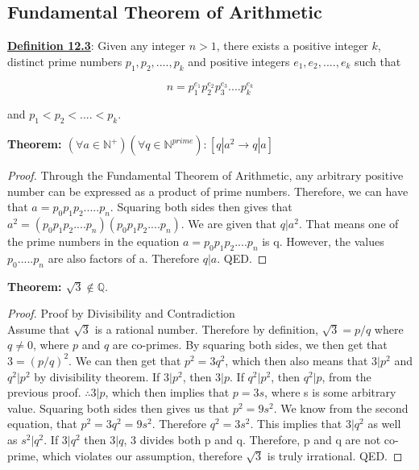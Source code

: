 \subsection{Fundamental Theorem of Arithmetic}
\textbf{\underline{Definition 12.3}}: Given any integer $n>1$, there exists a positive integer $k$, distinct prime numbers $p_1, p_2, ...., p_k$ and positive integers $e_1, e_2, ...., e_k$ such that

\begin{displaymath}
n=p_1^{e_1}p_2^{e_2}p_3^{e_3}....p_k^{e_k}
\end{displaymath}

and $p_1 < p_2 < .... < p_k$.

\begin{example}
    \textbf{Theorem: $(\forall a \in \mathbb{N}^+)(\forall q \in \mathbb{N}^{prime}) : [q|a^2 \rightarrow q|a]$}
\end{example}

\begin{proof}
    Through the Fundamental Theorem of Arithmetic, any arbitrary positive number can be expressed as a product of prime numbers. Therefore, we can have that $a=p_0p_1p_2.....p_n$. Squaring both sides then gives that $a^2=(p_0p_1p_2....p_n)(p_0p_1p_2....p_n)$. We are given that $q|a^2$. That means one of the prime numbers in the equation $a=p_0p_1p_2....p_n$ is q. However, the values $p_0.....p_n$ are also factors of a. Therefore $q|a$. QED.
\end{proof}

\begin{example}
    \textbf{Theorem: $\sqrt{3} \notin \mathbb{Q}$}.
\end{example}

\begin{proof}
    Proof by Divisibility and Contradiction\\
    Assume that $\sqrt{3}$ is a rational number. Therefore by definition, $\sqrt{3}=p/q$ where $q \neq 0$, where $p$ and $q$ are co-primes. By squaring both sides, we then get that $3=(p/q)^2$. We can then get that $p^2=3q^2$, which then also means that $3|p^2$ and $q^2|p^2$ by divisibility theorem. If $3|p^2$, then $3|p$. If $q^2|p^2$, then $q^2|p$, from the previous proof. $\therefore 3|p$, which then implies that $p=3s$, where s is some arbitrary value. Squaring both sides then gives us that $p^2=9s^2$. We know from the second equation, that $p^2=3q^2=9s^2$. Therefore $q^2=3s^2$. This implies that $3|q^2$ as well as $s^2|q^2$. If $3|q^2$ then $3|q$, 3 divides both p and q. Therefore, p and q are not co-prime, which violates our assumption, therefore $\sqrt{3}$ is truly irrational. QED. 
\end{proof}